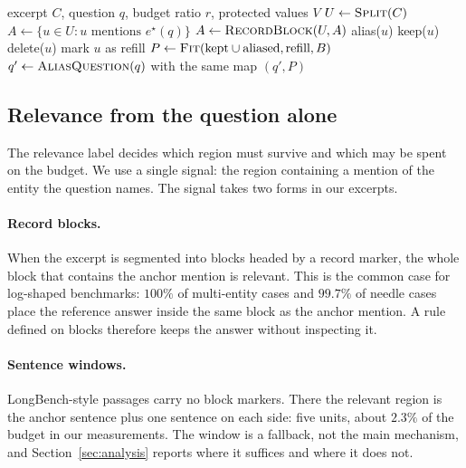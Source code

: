 \begin{algorithm}[t]
\caption{\textsc{DARK} prompt construction}
\label{alg:dark}
\begin{algorithmic}[1]
\Require excerpt $C$, question $q$, budget ratio $r$, protected values $V$
\State $U \gets \textsc{Split}(C)$
\State $A \gets \{u \in U : u \text{ mentions } e^\star(q)\}$
\State $A \gets \textsc{RecordBlock}(U, A)$ 
      \State alias($u$) 
     \Else{} \State keep($u$) 
     \EndIf
     \State delete($u$) 
  \Else{} \State mark $u$ as refill
  \EndIf
\EndFor
\State $P \gets \textsc{Fit}(\text{kept} \cup \text{aliased}, \text{refill}, B)$
\State $q' \gets \textsc{AliasQuestion}(q)$ with the same map
\State \Return $(q', P)$
\end{algorithmic}
\end{algorithm}

\subsection{Relevance from the question alone}

The relevance label decides which region must survive and which may be spent on the budget.
We use a single signal: the region containing a mention of the entity the question names.
The signal takes two forms in our excerpts.

\paragraph{Record blocks.}
When the excerpt is segmented into blocks headed by a record marker, the whole block that
contains the anchor mention is relevant. This is the common case for log-shaped benchmarks:
$100\%$ of multi-entity cases and $99.7\%$ of needle cases place the reference answer inside
the same block as the anchor mention. A rule defined on blocks therefore keeps the answer
without inspecting it.

\paragraph{Sentence windows.}
LongBench-style passages carry no block markers. There the relevant region is the anchor
sentence plus one sentence on each side: five units, about $2.3\%$ of the budget in our
measurements. The window is a fallback, not the main mechanism, and
Section~\ref{sec:analysis} reports where it suffices and where it does not.

